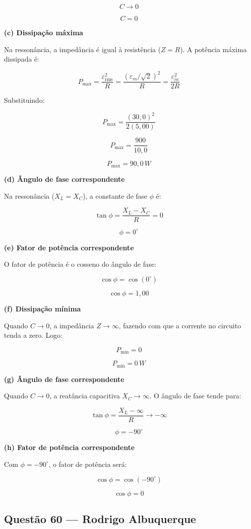 \documentclass[12pt,a4paper]{article}
\begin{document}
\[
C \to 0
\]

\[
\boxed{C = 0}
\]

\textbf{(c) Dissipação máxima}

Na ressonância, a impedância é igual à resistência (\(Z = R\)). A potência máxima dissipada é:

\[
P_{\max} = \frac{\varepsilon_{\text{rms}}^2}{R} = \frac{(\varepsilon_m / \sqrt{2})^2}{R} = \frac{\varepsilon_m^2}{2R}
\]

Substituindo:

\[
P_{\max} = \frac{(30,0)^2}{2(5,00)}
\]

\[
P_{\max} = \frac{900}{10,0}
\]

\[
\boxed{P_{\max} = 90,0\,W}
\]

\textbf{(d) Ângulo de fase correspondente}

Na ressonância (\(X_L = X_C\)), a constante de fase \(\phi\) é:

\[
\tan \phi = \frac{X_L - X_C}{R} = 0
\]

\[
\boxed{\phi = 0^\circ}
\]

\textbf{(e) Fator de potência correspondente}

O fator de potência é o cosseno do ângulo de fase:

\[
\cos \phi = \cos(0^\circ)
\]

\[
\boxed{\cos \phi = 1,00}
\]

\textbf{(f) Dissipação mínima}

Quando \(C \to 0\), a impedância \(Z \to \infty\), fazendo com que a corrente no circuito tenda a zero. Logo:

\[
P_{\min} = 0
\]

\[
\boxed{P_{\min} = 0\,W}
\]

\textbf{(g) Ângulo de fase correspondente}

Quando \(C \to 0\), a reatância capacitiva \(X_C \to \infty\). O ângulo de fase tende para:

\[
\tan \phi = \frac{X_L - \infty}{R} \to -\infty
\]

\[
\boxed{\phi = -90^\circ}
\]

\textbf{(h) Fator de potência correspondente}

Com \(\phi = -90^\circ\), o fator de potência será:

\[
\cos \phi = \cos(-90^\circ)
\]

\[
\boxed{\cos \phi = 0}
\]
\subsection{Questão 60 — Rodrigo Albuquerque}
\end{document}
